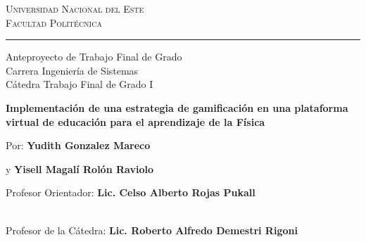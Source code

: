 \documentclass[12pt,a4paper]{article}
\begin{document}
\renewcommand{\tablename}{Tabla}
\renewcommand{\refname}{Referencias bibliográficas}

\begin{titlepage}

\vspace*{-3cm}


{\bf
\begin{center}
\large
\vspace*{-1 cm}\Large \textsc{Universidad Nacional del Este} \\
\Large \textsc{Facultad Politécnica} \\
\vspace*{0.5 cm}\hrule
\vspace*{0.5 cm}
\vspace*{0 cm}\Large Anteproyecto de  Trabajo Final de Grado\\
\vspace*{0.5 cm}\large Carrera Ingeniería de Sistemas\\
\vspace*{0 cm}\large Cátedra Trabajo Final de Grado I\\
\end{center}
}

\vspace{2 cm}
{
\noindent
\begin{center}
\huge \bf Implementación de una estrategia de gamificación en una plataforma virtual de educación para el aprendizaje de la Física
\end{center}
}

\vspace{0.5 cm}

{ 
Por: \textbf{\Large Yudith Gonzalez Mareco}

\hspace{1 cm} y \textbf{\Large Yisell Magalí Rolón Raviolo}

\vspace*{.5 cm}
Profesor Orientador: \textbf{\large Lic. Celso Alberto Rojas Pukall }
}%
\vspace*{0.5 cm}\\

Profesor de la Cátedra: \textbf{\large Lic. Roberto Alfredo Demestri Rigoni}

\vspace{3.0cm}


\end{titlepage}
\end{document}
